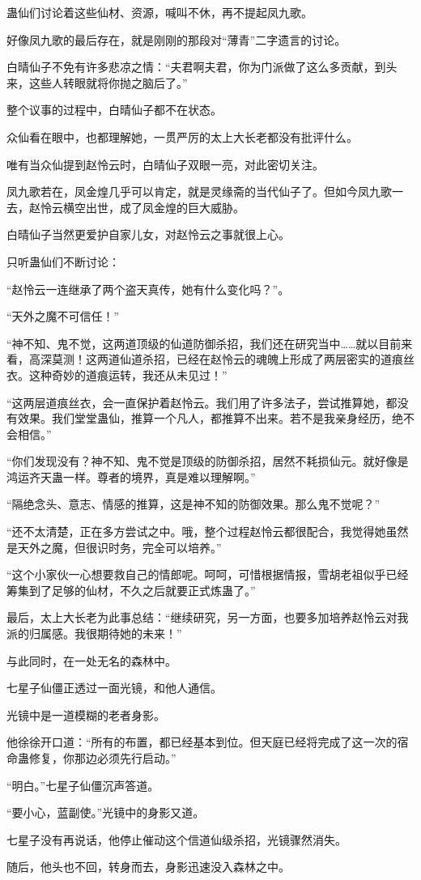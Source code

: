 \begin{this_body}
蛊仙们讨论着这些仙材、资源，喊叫不休，再不提起凤九歌。

好像凤九歌的最后存在，就是刚刚的那段对“薄青”二字遗言的讨论。

白晴仙子不免有许多悲凉之情：“夫君啊夫君，你为门派做了这么多贡献，到头来，这些人转眼就将你抛之脑后了。”

整个议事的过程中，白晴仙子都不在状态。

众仙看在眼中，也都理解她，一贯严厉的太上大长老都没有批评什么。

唯有当众仙提到赵怜云时，白晴仙子双眼一亮，对此密切关注。

凤九歌若在，凤金煌几乎可以肯定，就是灵缘斋的当代仙子了。但如今凤九歌一去，赵怜云横空出世，成了凤金煌的巨大威胁。

白晴仙子当然更爱护自家儿女，对赵怜云之事就很上心。

只听蛊仙们不断讨论：

“赵怜云一连继承了两个盗天真传，她有什么变化吗？”。

“天外之魔不可信任！”

“神不知、鬼不觉，这两道顶级的仙道防御杀招，我们还在研究当中……就以目前来看，高深莫测！这两道仙道杀招，已经在赵怜云的魂魄上形成了两层密实的道痕丝衣。这种奇妙的道痕运转，我还从未见过！”

“这两层道痕丝衣，会一直保护着赵怜云。我们用了许多法子，尝试推算她，都没有效果。我们堂堂蛊仙，推算一个凡人，都推算不出来。若不是我亲身经历，绝不会相信。”

“你们发现没有？神不知、鬼不觉是顶级的防御杀招，居然不耗损仙元。就好像是鸿运齐天蛊一样。尊者的境界，真是难以理解啊。”

“隔绝念头、意志、情感的推算，这是神不知的防御效果。那么鬼不觉呢？”

“还不太清楚，正在多方尝试之中。哦，整个过程赵怜云都很配合，我觉得她虽然是天外之魔，但很识时务，完全可以培养。”

“这个小家伙一心想要救自己的情郎呢。呵呵，可惜根据情报，雪胡老祖似乎已经筹集到了足够的仙材，不久之后就要正式炼蛊了。”

最后，太上大长老为此事总结：“继续研究，另一方面，也要多加培养赵怜云对我派的归属感。我很期待她的未来！”

与此同时，在一处无名的森林中。

七星子仙僵正透过一面光镜，和他人通信。

光镜中是一道模糊的老者身影。

他徐徐开口道：“所有的布置，都已经基本到位。但天庭已经将完成了这一次的宿命蛊修复，你那边必须先行启动。”

“明白。”七星子仙僵沉声答道。

“要小心，蓝副使。”光镜中的身影又道。

七星子没有再说话，他停止催动这个信道仙级杀招，光镜骤然消失。

随后，他头也不回，转身而去，身影迅速没入森林之中。

\end{this_body}

